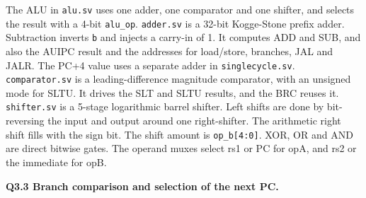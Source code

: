 \documentclass[10pt,a4paper]{article}
\newcommand{\code}[1]{\texttt{#1}}
\begin{document}
The ALU in \code{alu.sv} uses one adder, one comparator and one shifter, and
selects the result with a 4-bit \code{alu\_op}. \code{adder.sv} is a 32-bit
Kogge-Stone prefix adder. Subtraction inverts \code{b} and injects a carry-in
of 1. It computes ADD and SUB, and also the AUIPC result and the addresses for
load/store, branches, JAL and JALR. The PC+4 value uses a separate adder in \code{singlecycle.sv}.
\code{comparator.sv} is a leading-difference magnitude comparator, with an
unsigned mode for SLTU. It drives the SLT and SLTU results, and the BRC reuses
it. \code{shifter.sv} is a 5-stage logarithmic barrel shifter. Left shifts are
done by bit-reversing the input and output around one right-shifter. The
arithmetic right shift fills with the sign bit. The shift amount is
\code{op\_b[4:0]}. XOR, OR and AND are direct bitwise gates. The operand muxes
select rs1 or PC for opA, and rs2 or the immediate for opB.

\textbf{Q3.3 Branch comparison and selection of the next PC.}
\end{document}

